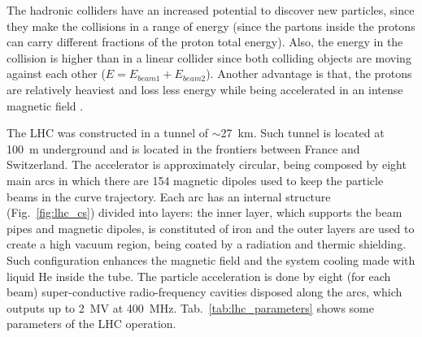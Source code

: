 The hadronic colliders have an increased potential to discover new particles, since they make the collisions in a range of energy (since the partons inside the protons can carry different fractions of the proton total energy). Also, the energy in the collision is higher than in a linear collider since both colliding objects are moving against each other ($E = E_{beam1} + E_{beam2}$). Another advantage is that, the protons are relatively heaviest and loss less energy while being accelerated in an intense magnetic field \cite{bib:Nature-448-2017}.

The LHC was constructed in a tunnel of $\sim$27~km. Such tunnel is located at 100~m underground and is located in the frontiers between France and Switzerland. The accelerator is approximately circular, being composed by eight main arcs in which there are 154 magnetic dipoles used to keep the particle beams in the curve trajectory. Each arc has an internal structure (Fig.~\ref{fig:lhc_cs}) divided into layers: the inner layer, which supports the beam pipes and magnetic dipoles, is constituted of iron and the outer layers are used to create a high vacuum region, being coated by a radiation and thermic shielding. Such configuration enhances the magnetic field and the system cooling made with liquid He inside the tube. The particle acceleration is done by eight (for each beam) super-conductive radio-frequency cavities disposed along the arcs, which outputs up to 2~MV at 400~MHz. Tab.~\ref{tab:lhc_parameters} shows some parameters of the LHC operation.

